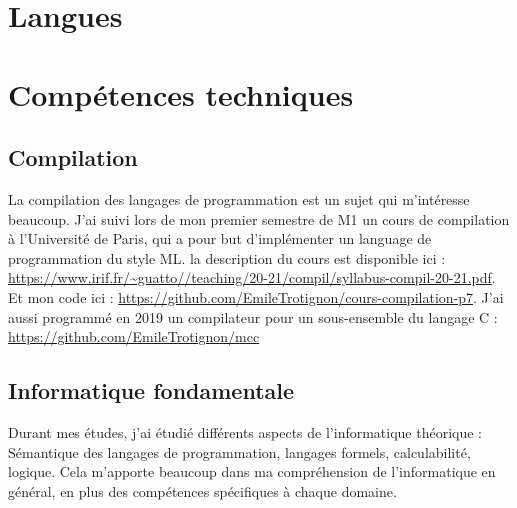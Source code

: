 \documentclass[10pt, a4paper, roman, french]{moderncv}
\begin{document}
	 
	 
	 

	\section{Langues}
		
		
			
	\section{Compétences techniques}
	
		\subsection{Compilation}
			La compilation des langages de programmation est un sujet qui m'intéresse beaucoup. J'ai suivi lors de mon premier semestre de M1 un cours de compilation à l'Université de Paris, qui a pour but d'implémenter un language de programmation du style ML.
la description du cours est disponible ici : \url{https://www.irif.fr/~guatto//teaching/20-21/compil/syllabus-compil-20-21.pdf}.
Et mon code ici : \url{https://github.com/EmileTrotignon/cours-compilation-p7}.
J'ai aussi programmé en 2019 un compilateur pour un sous-ensemble du langage C : \url{https://github.com/EmileTrotignon/mcc}
	
		\subsection{Informatique fondamentale}
			Durant mes études, j'ai étudié différents aspects de l'informatique théorique :
Sémantique des langages de programmation, langages formels, calculabilité, logique.
Cela m'apporte beaucoup dans ma compréhension de l'informatique en général, en plus des compétences spécifiques à chaque domaine.
	
\end{document}
